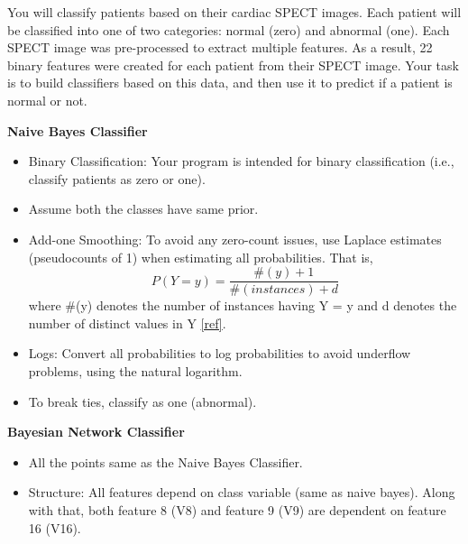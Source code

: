 \documentclass[addpoints,11pt,a4paper]{exam}
\begin{document}
\begin{questions}
You will classify patients based on their cardiac SPECT images. Each patient will be classified into one of two categories: normal (zero) and abnormal (one). Each SPECT image was pre-processed to extract multiple features. As a result, 22 binary features were created for each patient from their SPECT image. Your task is to build classifiers based on this data, and then use it to predict if a patient is normal or not.

\textbf{Naive Bayes Classifier}
\begin{itemize}
    \item Binary Classification: Your program is intended for binary classification (i.e., classify patients as zero or one).
    \item Assume both the classes have same prior.
    \item Add-one Smoothing: To avoid any zero-count issues, use Laplace estimates (pseudocounts of 1) when estimating all probabilities. That is, 
    \begin{equation*}
        P(Y=y) = \frac{\#(y)+1}{\#(instances)+d}
    \end{equation*}
    where \#(y) denotes the number of instances having Y = y and d denotes the number of distinct values in Y  \href{https://en.wikipedia.org/wiki/Additive_smoothing}{[ref]}.
    \item Logs: Convert all probabilities to log probabilities to avoid underflow problems, using the natural logarithm.
    \item To break ties, classify as one (abnormal).
\end{itemize}

\textbf{Bayesian Network Classifier}
\begin{itemize}
    \item All the points same as the Naive Bayes Classifier.
    \item Structure: All features depend on class variable (same as naive bayes).  Along with that, both feature 8 (V8) and feature 9 (V9) are dependent on feature 16 (V16).
\end{itemize}


\end{questions}
\end{document}

